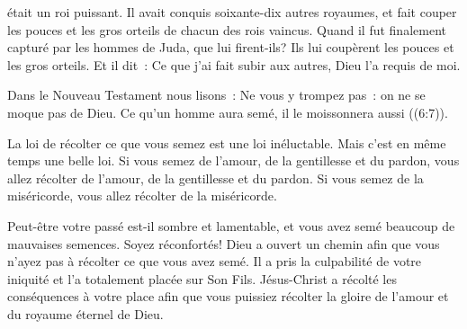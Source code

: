 

 était un roi puissant.
 Il avait conquis soixante-dix autres royaumes, et fait couper les pouces
 et les gros orteils de chacun des rois vaincus.
 Quand il fut finalement capturé par les hommes de Juda, que lui firent-ils?
 Ils lui coupèrent les pouces et les gros orteils.
 Et il dit~: \og Ce que j'ai fait subir aux autres, Dieu l'a requis de moi. \fg{}

Dans le Nouveau Testament nous lisons~:
 \og Ne vous y trompez pas~: on ne se moque pas de Dieu.
 Ce qu'un homme aura semé, il le moissonnera aussi \fg{} ((6:7)).


La loi de récolter ce que vous semez est une loi inéluctable.
 Mais c'est en même temps une belle loi.
 Si vous semez de l'amour, de la gentillesse et du pardon,
 vous allez récolter de l'amour, de la gentillesse et du pardon.
 Si vous semez de la miséricorde, vous allez récolter de la miséricorde.

Peut-être votre passé est-il sombre et lamentable,
 et vous avez semé beaucoup de mauvaises semences.
 Soyez réconfortés!
 Dieu a ouvert un chemin afin que vous n'ayez pas à récolter
 ce que vous avez semé.
 Il a pris la culpabilité de votre iniquité et l'a totalement placée
 sur Son Fils.
 Jésus-Christ a récolté les conséquences à votre place
 \ocadr afin que vous puissiez récolter la gloire de l'amour
 et du royaume éternel de Dieu. 

\dvrule






